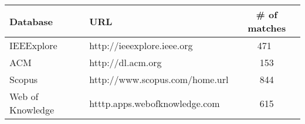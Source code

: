 \begin{center}
\label{databasetable}
\begin{tabular}{l l c }
    \bfseries{Database} & \bfseries{URL} & \bfseries{\# of matches} \\
    \hline
    IEEExplore & http://ieeexplore.ieee.org & 471 \\
    ACM & http://dl.acm.org & 153 \\
    Scopus & http://www.scopus.com/home.url & 844 \\
    Web of Knowledge & htttp.apps.webofknowledge.com &  615 \\
\end{tabular}
\end{center}

